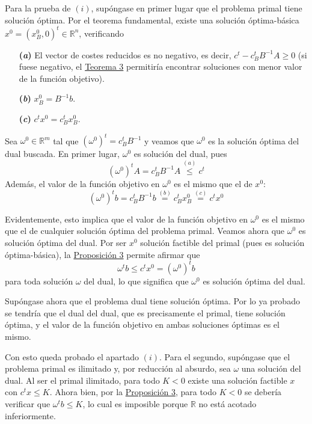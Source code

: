 \documentclass[11pt]{report}
\makeatletter
\renewenvironment{proof}[1][\proofname]{\par
  \pushQED{\qed}%
  \normalfont \topsep\z@skip %
  \trivlist
  \item[\hskip\labelsep
        \itshape
    #1\@addpunct{.}]\ignorespaces
}{%
  \popQED\endtrivlist\@endpefalse
}
\theoremstyle{mytheorem}
\theoremstyle{mydefinition}
\theoremstyle{myexample}
\let\oldproofname=\proofname
\renewcommand{\proofname}{\rm\bf{\oldproofname}}}
\newcommand{\R}{\mathbb R}
\makeatother
\begin{document}
\begin{proof}
Para la prueba de $(i)$, supóngase en primer lugar que el problema primal tiene solución óptima. Por el teorema fundamental, existe una solución óptima-básica $x^0=(x_B^0,0)^t \in \R^n$, verificando 
\begin{itemize}
    \item[\textbf{(\textit{a})}] El vector de costes reducidos es no negativo, es decir, $c^t-c_B^tB^{-1}A \geq 0$ (si fuese negativo, el \hyperref[teo2.1.]{\color{gray}Teorema 3} permitiría encontrar soluciones con menor valor de la función objetivo).
    \item[\textbf{(\textit{b})}] $x^0_B = B^{-1}b$.
    \item[\textbf{(\textit{c})}] $c^tx^0 = c_B^tx_B^0$.
    \end{itemize}
    
Sea $\omega^0 \in \R^m$ tal que $(\omega^0)^t = c_B^tB^{-1}$ y veamos que $\omega^0$ es la solución óptima del dual buscada. En primer lugar, $\omega^0$ es solución del dual, pues
\[(\omega^0)^t A = c_B^tB^{-1}A \overset{(a)}{\leq} c^t\]
Además, el valor de la función objetivo en $\omega^0$ es el mismo que el de $x^0$: 
\[(\omega^0)^tb = c_B^tB^{-1}b \overset{(b)}{=} c_B^tx^0_B \overset{(c)}{=} c^tx^0\]

Evidentemente, esto implica que el valor de la función objetivo en $\omega^0$ es el mismo que el de cualquier solución óptima del problema primal. Veamos ahora que $\omega^0$ es solución óptima del dual. Por ser $x^0$ solución factible del primal (pues es solución óptima-básica), la \hyperref[prop3.2.]{\color{gray}Proposición 3} permite afirmar que
\[\omega^t b \leq c^tx^0 = (\omega^0)^tb\]
para toda solución $\omega$ del dual, lo que significa que $\omega^0$ es solución óptima del dual.



Supóngase ahora que el problema dual tiene solución óptima. Por lo ya probado se tendría que el dual del dual, que es precisamente el primal, tiene solución óptima, y el valor de la función objetivo en ambas soluciones óptimas es el mismo.



Con esto queda probado el apartado $(i)$. Para el segundo, supóngase que el problema primal es ilimitado y, por reducción al absurdo, sea $\omega$ una solución del dual. Al ser el primal ilimitado, para todo $K <0$ existe una solución factible $x$ con $c^tx \leq K$. Ahora bien, por la \hyperref[prop3.2.]{\color{gray}Proposición 3}, para todo $K <0$ se debería verificar que $\omega^t b \leq K$, lo cual es imposible porque $\R$ no está acotado inferiormente. 




\end{proof}
\end{document}
